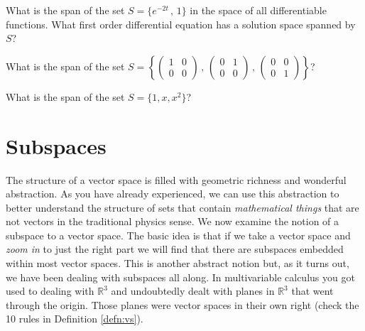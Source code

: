 \begin{problem}
    What is the span of the set $S = \{ e^{-2t} \, , \, 1 \}$ in the space of all
    differentiable functions. What first order differential equation has a solution space spanned by $S$?
\end{problem}

\begin{problem}
    What is the span of the set $S = \left\{ \begin{pmatrix} 1 & 0 \\ 0 & 0 \end{pmatrix}
    \, , \, \begin{pmatrix} 0 & 1 \\ 0 & 0 \end{pmatrix} \, , \, \begin{pmatrix} 0 & 0 \\
        0 & 1 \end{pmatrix} \right\}$?
\end{problem}

\begin{problem}
    What is the span of the set $S = \{1, x, x^2\}$?
\end{problem}



\section{Subspaces}
The structure of a vector space is filled with geometric richness and wonderful
abstraction.  As you have already experienced, we can use this abstraction to better
understand the structure of sets that contain {\it mathematical things} that are not
vectors in the traditional physics sense.  We now examine the notion of a subspace to a
vector space.  The basic idea is that if we take a vector space and {\it zoom in} to just
the right part we will find that there are subspaces embedded within most vector spaces.
This is another abstract notion but, as it turns out, we have been dealing with subspaces
all along.  In multivariable calculus you got used to dealing with $\mathbb{R}^3$ and
undoubtedly dealt with planes in $\mathbb{R}^3$ that went through the origin.  Those
planes were vector spaces in their own right (check the 10 rules in Definition
\ref{defn:vs}). 

